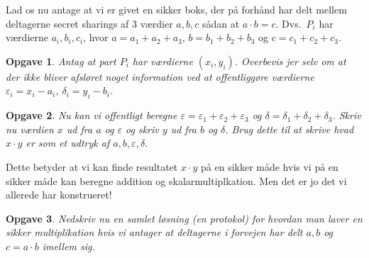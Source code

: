 \documentclass{article}
\theoremstyle{opgavedd}
\newtheorem{opgave}{Opgave}[section]
\begin{document}
Lad os nu antage at vi er givet en sikker boks, der på forhånd har delt mellem deltagerne
secret sharings af 3 værdier $a,b,c$ sådan at $a\cdot b = c$. Dvs.~$P_{i}$ har værdierne
$a_{i},b_{i},c_{i}$, hvor $a=a_{1}+a_{2}+a_{3}$, $b=b_{1}+b_{2}+b_{3}$ og
$c=c_{1}+c_{2}+c_{3}$.

\begin{opgave}
  Antag at part $P_{i}$ har værdierne $(x_{i}, y_{i})$. Overbevis jer selv om at der ikke
  bliver afsløret noget information ved at offentliggøre værdierne
  $\varepsilon_{i}=x_{i}-a_{i}$, $\delta_{i}=y_{i}-b_{i}$.
\end{opgave}

\begin{opgave}
  Nu kan vi offentligt beregne
  $\varepsilon=\varepsilon_{1}+\varepsilon_{2}+\varepsilon_{3}$ og
  $\delta=\delta_{1}+\delta_{2}+\delta_{3}$. Skriv nu værdien $x$ ud fra $a$ og
  $\varepsilon$ og skriv $y$ ud fra $b$ og $\delta$. Brug dette til at skrive hvad
  $x\cdot y$ er som et udtryk af $a,b,\varepsilon,\delta$.
\end{opgave}

Dette betyder at vi kan finde resultatet $x\cdot y$ på en sikker måde hvis vi på en sikker
måde kan beregne addition og skalarmultiplkation. Men det er jo det vi allerede har
konstrueret!

\begin{opgave}
  Nedskriv nu en samlet løsning (en protokol) for hvordan man laver en sikker
  multiplikation hvis vi antager at deltagerne i forvejen har delt $a,b$ og $c=a\cdot b$
  imellem sig.
\end{opgave}
\end{document}
